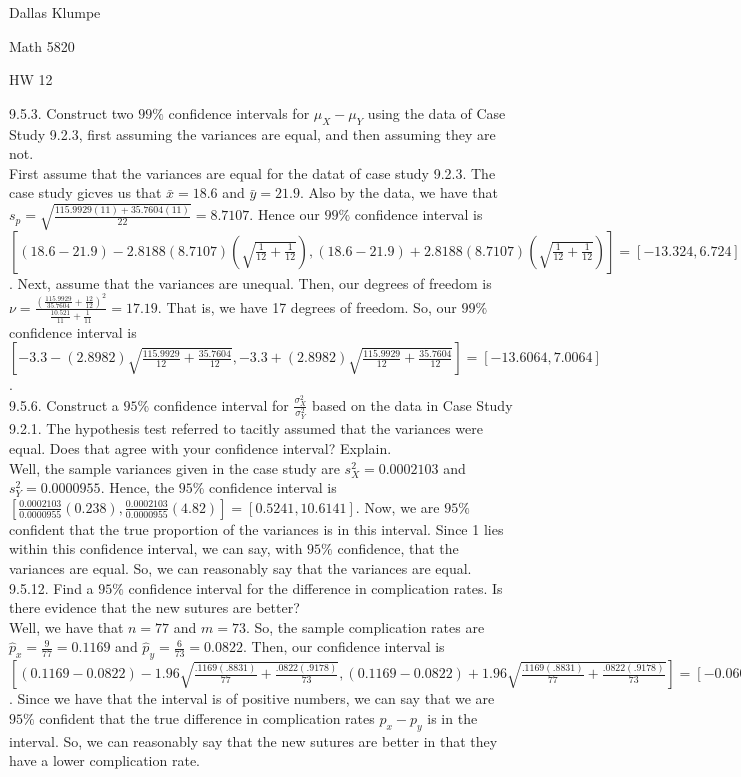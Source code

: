 \documentclass[12pt]{article}
\begin{document}
\noindent Dallas Klumpe

\noindent Math 5820

\noindent HW 12

9.5.3. Construct two $99\%$ confidence intervals for $\mu_X-\mu_Y$ using the data of Case Study 9.2.3, first assuming the variances are equal, and then assuming they are not.\\
First assume that the variances are equal for the datat of case study 9.2.3. The case study gicves us that $\bar{x}=18.6$ and $\bar{y}=21.9$. Also by the data, we have that $s_p=\sqrt{\frac{115.9929(11)+35.7604(11)}{22}}=8.7107$. Hence our $99\%$ confidence interval is $[(18.6-21.9)-2.8188(8.7107)(\sqrt{\frac{1}{12}+\frac{1}{12}}), (18.6-21.9)+2.8188(8.7107)(\sqrt{\frac{1}{12}+\frac{1}{12}})]=[-13.324, 6.724]$. Next, assume that the variances are unequal. Then, our degrees of freedom is $\nu=\frac{(\frac{115.9929}{35.7604}+\frac{12}{12})^2}{\frac{10.521}{11}+\frac{1}{11}}=17.19$. That is, we have 17 degrees of freedom. So, our $99\%$ confidence interval is $[-3.3-(2.8982)\sqrt{\frac{115.9929}{12}+\frac{35.7604}{12}}, -3.3+(2.8982)\sqrt{\frac{115.9929}{12}+\frac{35.7604}{12}}]=[-13.6064, 7.0064]$.\\[20pt]

9.5.6. Construct a $95\%$ confidence interval for $\frac{\sigma_X^2}{\sigma_Y^2}$ based on the data in Case Study 9.2.1. The hypothesis test referred to tacitly assumed that the variances were equal. Does that agree with your confidence interval? Explain.\\
Well, the sample variances given in the case study are $s_X^2=0.0002103$ and $s_Y^2=0.0000955$. Hence, the $95\%$ confidence interval is $[\frac{0.0002103}{0.0000955}(0.238), \frac{0.0002103}{0.0000955}(4.82)]=[0.5241, 10.6141]$. Now, we are $95\%$ confident that the true proportion of the variances is in this interval. Since 1 lies within this confidence interval, we can say, with $95\%$ confidence, that the variances are equal. So, we can reasonably say that the variances are equal.\\[20pt]

9.5.12. Find a $95\%$ confidence interval for the difference in complication rates. Is there evidence that the new sutures are better?\\
Well, we have that $n=77$ and $m=73$. So, the sample complication rates are $\hat{p}_x=\frac{9}{77}=0.1169$ and $\hat{p}_y=\frac{6}{73}=0.0822$. Then, our confidence interval is $[(0.1169-0.0822)-1.96\sqrt{\frac{.1169(.8831)}{77}+\frac{.0822(.9178)}{73}}, (0.1169-0.0822)+1.96\sqrt{\frac{.1169(.8831)}{77}+\frac{.0822(.9178)}{73}}]=[-0.0608, 0.1302]$. Since we have that the interval is of positive numbers, we can say that we are $95\%$ confident that the true difference in complication rates $p_x-p_y$ is in the interval. So, we can reasonably say that the new sutures are better in that they have a lower complication rate.
\end{document}
